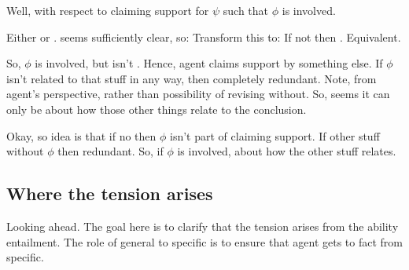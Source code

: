 \begin{note}
  Well, with respect to claiming support for \(\psi\) such that \(\phi\) is involved.

  Either \adA{} or \adB{}.
  \adA{} seems sufficiently clear, so:
  Transform this to: If not \adA{} then \adB{}.
  Equivalent.
\end{note}

\begin{note}[Idea]
  So, \(\phi\) is involved, but isn't \adA{}.
  Hence, agent claims support by something else.
  If \(\phi\) isn't related to that stuff in any way, then completely redundant.
  Note, from agent's perspective, rather than possibility of revising without.
  So, seems it can only be about how those other things relate to the conclusion.

  Okay, so idea is that if no \adA{} then \(\phi\) isn't part of claiming support.
  If other stuff without \(\phi\) then redundant.
  So, if \(\phi\) is involved, about how the other stuff relates.
\end{note}

\subsection{Where the tension arises}
\label{sec:where-tension-arises}

\begin{note}
  {
    \color{red}
    Looking ahead.
  }
  The goal here is to clarify that the tension arises from the ability entailment.
  The role of general to specific is to ensure that agent gets to fact from specific.
\end{note}




